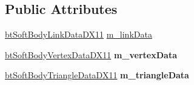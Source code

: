 \subsection*{Public Attributes}
\begin{DoxyCompactItemize}
\item 
\hyperlink{classbt_soft_body_link_data_d_x11}{bt\+Soft\+Body\+Link\+Data\+D\+X11} \hyperlink{classbt_d_x11_soft_body_solver_a0477894bad3bbed9dcfd7922baeb782d}{m\+\_\+link\+Data}
\item 
\hypertarget{classbt_d_x11_soft_body_solver_a4e6bf3c6c038adf0c812e905edbf985a}{\hyperlink{classbt_soft_body_vertex_data_d_x11}{bt\+Soft\+Body\+Vertex\+Data\+D\+X11} {\bfseries m\+\_\+vertex\+Data}}\label{classbt_d_x11_soft_body_solver_a4e6bf3c6c038adf0c812e905edbf985a}

\item 
\hypertarget{classbt_d_x11_soft_body_solver_a4372069aa895c45f25f8ec330be81ab2}{\hyperlink{classbt_soft_body_triangle_data_d_x11}{bt\+Soft\+Body\+Triangle\+Data\+D\+X11} {\bfseries m\+\_\+triangle\+Data}}\label{classbt_d_x11_soft_body_solver_a4372069aa895c45f25f8ec330be81ab2}

\end{DoxyCompactItemize}
